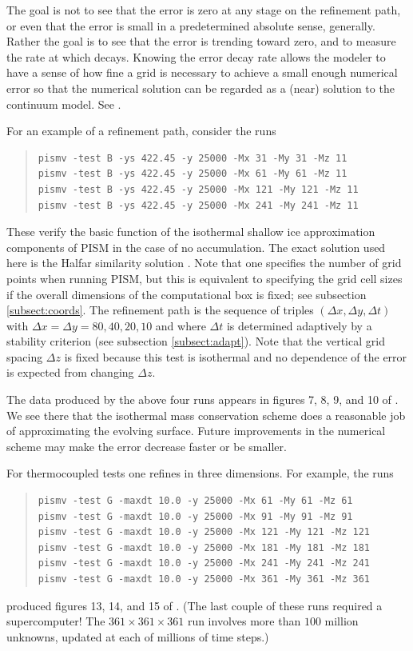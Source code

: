 \documentclass[11pt,final]{amsart}
\begin{document}
The goal is not to see that the error is zero at any stage on the refinement path, or even that the error is small in a predetermined absolute sense, generally.  Rather the goal is to see that the error is trending toward zero, and to measure the rate at which decays.  Knowing the error decay rate allows the modeler to have a sense of how fine a grid is necessary to achieve a small enough numerical error so that the numerical solution can be regarded as a (near) solution to the continuum model.  See \cite{BLKCB,BBL,Roache,Wesseling}.

For an example of a refinement path, consider the runs
\begin{quote}\small\begin{verbatim}
pismv -test B -ys 422.45 -y 25000 -Mx 31 -My 31 -Mz 11
pismv -test B -ys 422.45 -y 25000 -Mx 61 -My 61 -Mz 11
pismv -test B -ys 422.45 -y 25000 -Mx 121 -My 121 -Mz 11
pismv -test B -ys 422.45 -y 25000 -Mx 241 -My 241 -Mz 11
\end{verbatim}
\normalsize\end{quote}
These verify the basic function of the isothermal shallow ice approximation components of PISM in the case of no accumulation.  The exact solution used here is the Halfar similarity solution \cite{Halfar83}.  Note that one specifies the number of grid points when running PISM, but this is equivalent to specifying the grid cell sizes if the overall dimensions of the computational box is fixed; see subsection \ref{subsect:coords}.  The refinement path is the sequence of triples $(\Delta x,\Delta y,\Delta t)$ with $\Delta x = \Delta y = 80,40,20,10$ and where $\Delta t$ is determined adaptively by a stability criterion (see subsection \ref{subsect:adapt}).  Note that the vertical grid spacing $\Delta z$ is fixed because this test is isothermal and no dependence of the error is expected from changing $\Delta z$.

The data produced by the above four runs appears in figures 7, 8, 9, and 10 of \cite{BLKCB}.  We see there that the isothermal mass conservation scheme does a reasonable job of approximating the evolving surface.  Future improvements in the numerical scheme may make the error decrease faster or be smaller.

For thermocoupled tests one refines in three dimensions.  For example, the runs
\begin{quote}\small\begin{verbatim}
pismv -test G -maxdt 10.0 -y 25000 -Mx 61 -My 61 -Mz 61
pismv -test G -maxdt 10.0 -y 25000 -Mx 91 -My 91 -Mz 91
pismv -test G -maxdt 10.0 -y 25000 -Mx 121 -My 121 -Mz 121
pismv -test G -maxdt 10.0 -y 25000 -Mx 181 -My 181 -Mz 181
pismv -test G -maxdt 10.0 -y 25000 -Mx 241 -My 241 -Mz 241
pismv -test G -maxdt 10.0 -y 25000 -Mx 361 -My 361 -Mz 361
\end{verbatim}
\normalsize\end{quote}
produced figures 13, 14, and 15 of \cite{BBL}.  (The last couple of these runs required a supercomputer!  The $361\times 361\times 361$ run involves more than $100$ million unknowns, updated at each of millions of time steps.)
\end{document}
